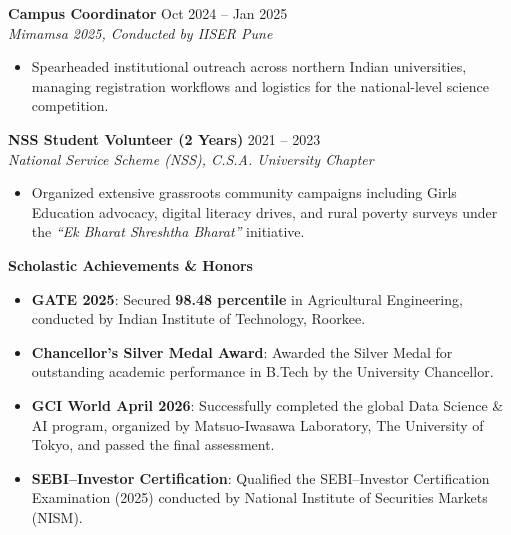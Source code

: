 \documentclass[10pt]{article}
\begin{document}
\vspace{5pt}

\textbf{Campus Coordinator} \hfill Oct 2024 -- Jan 2025\\
\textit{Mimamsa 2025, Conducted by IISER Pune}
\begin{itemize}[noitemsep, topsep=1.5pt, partopsep=0pt, parsep=1pt]
    \item Spearheaded institutional outreach across northern Indian universities, managing registration workflows and logistics for the national-level science competition.
\end{itemize}

\vspace{5pt}

\textbf{NSS Student Volunteer (2 Years)} \hfill 2021 -- 2023\\
\textit{National Service Scheme (NSS), C.S.A. University Chapter}
\begin{itemize}[noitemsep, topsep=1.5pt, partopsep=0pt, parsep=1pt]
    \item Organized extensive grassroots community campaigns including Girls Education advocacy, digital literacy drives, and rural poverty surveys under the \textit{``Ek Bharat Shreshtha Bharat''} initiative.
\end{itemize}

\vspace{8pt}

\begin{center}
    \textbf{Scholastic Achievements \& Honors}
\end{center}
\vspace{-4pt}

\begin{itemize}[noitemsep, topsep=1.5pt, partopsep=0pt, parsep=1.5pt]
    \item \textbf{GATE 2025}: Secured \textbf{98.48 percentile} in Agricultural Engineering, conducted by Indian Institute of Technology, Roorkee.
    \item \textbf{Chancellor's Silver Medal Award}: Awarded the Silver Medal for outstanding academic performance in B.Tech by the University Chancellor.
    \item \textbf{GCI World April 2026}: Successfully completed the global Data Science \& AI program, organized by Matsuo-Iwasawa Laboratory, The University of Tokyo, and passed the final assessment.
    \item \textbf{SEBI--Investor Certification}: Qualified the SEBI--Investor Certification Examination (2025) conducted by National Institute of Securities Markets (NISM).
\end{itemize}
\end{document}
